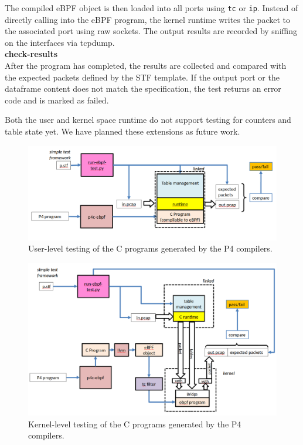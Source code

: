 The compiled eBPF object is then loaded into all ports using \texttt{tc} or 
\texttt{ip}. Instead of directly calling into the eBPF program, the kernel 
runtime writes the packet to the associated port using raw sockets. The output 
results are recorded by sniffing on the interfaces via tcpdump.\\
\textbf{check-results}\\
After the program has completed, the results are collected and compared with 
the expected packets defined by the STF template. If the output port or the 
dataframe content does not match the specification, the test returns an error 
code and is marked as failed.

Both the user and kernel space runtime do not support testing for counters 
and table state yet. We have planned these extensions as future work.
\begin{figure}
	\centering
	\includegraphics[width=\linewidth]{user_test}
	\caption{User-level testing of the C programs generated by the P4 compilers.}
	\label{fig:user_test}
\end{figure}
\begin{figure}
	\centering
	\includegraphics[width=\linewidth]{kernel_test}
	\caption{Kernel-level testing of the C programs generated by the P4 
	compilers.}
	\label{fig:kernel_test}
\end{figure}
